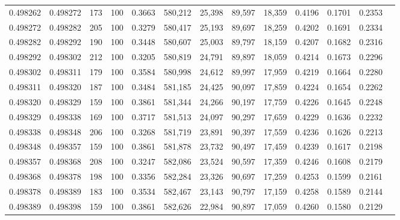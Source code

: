 \begin{tabular}{rrrrrrrrrrrrr}
0.498262 & 0.498272 &   173 & 100 &                                     0.3663 & 580,212 &  25,398 &  89,597 &  18,359 & 0.4196 & 0.1701 & 0.2353 \\
0.498272 & 0.498282 &   205 & 100 &                                     0.3279 & 580,417 &  25,193 &  89,697 &  18,259 & 0.4202 & 0.1691 & 0.2334 \\
0.498282 & 0.498292 &   190 & 100 &                                     0.3448 & 580,607 &  25,003 &  89,797 &  18,159 & 0.4207 & 0.1682 & 0.2316 \\
0.498292 & 0.498302 &   212 & 100 &                                     0.3205 & 580,819 &  24,791 &  89,897 &  18,059 & 0.4214 & 0.1673 & 0.2296 \\
0.498302 & 0.498311 &   179 & 100 &                                     0.3584 & 580,998 &  24,612 &  89,997 &  17,959 & 0.4219 & 0.1664 & 0.2280 \\
0.498311 & 0.498320 &   187 & 100 &                                     0.3484 & 581,185 &  24,425 &  90,097 &  17,859 & 0.4224 & 0.1654 & 0.2262 \\
0.498320 & 0.498329 &   159 & 100 &                                     0.3861 & 581,344 &  24,266 &  90,197 &  17,759 & 0.4226 & 0.1645 & 0.2248 \\
0.498329 & 0.498338 &   169 & 100 &                                     0.3717 & 581,513 &  24,097 &  90,297 &  17,659 & 0.4229 & 0.1636 & 0.2232 \\
0.498338 & 0.498348 &   206 & 100 &                                     0.3268 & 581,719 &  23,891 &  90,397 &  17,559 & 0.4236 & 0.1626 & 0.2213 \\
0.498348 & 0.498357 &   159 & 100 &                                     0.3861 & 581,878 &  23,732 &  90,497 &  17,459 & 0.4239 & 0.1617 & 0.2198 \\
0.498357 & 0.498368 &   208 & 100 &                                     0.3247 & 582,086 &  23,524 &  90,597 &  17,359 & 0.4246 & 0.1608 & 0.2179 \\
0.498368 & 0.498378 &   198 & 100 &                                     0.3356 & 582,284 &  23,326 &  90,697 &  17,259 & 0.4253 & 0.1599 & 0.2161 \\
0.498378 & 0.498389 &   183 & 100 &                                     0.3534 & 582,467 &  23,143 &  90,797 &  17,159 & 0.4258 & 0.1589 & 0.2144 \\
0.498389 & 0.498398 &   159 & 100 &                                     0.3861 & 582,626 &  22,984 &  90,897 &  17,059 & 0.4260 & 0.1580 & 0.2129 \\

\end{tabular}

